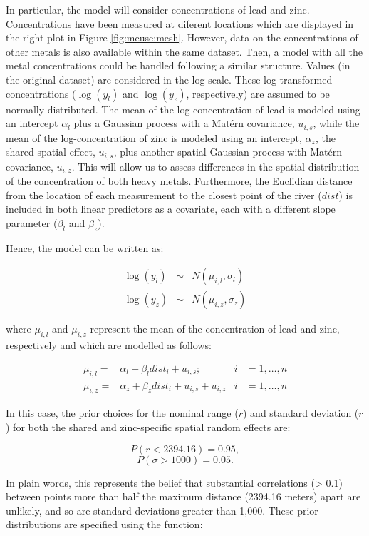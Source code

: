 In particular, the model will consider concentrations of lead and zinc. Concentrations have been measured at diferent locations which are displayed in the right plot in Figure \ref{fig:meuse:mesh}. However, data on the concentrations of other metals is also available within the same dataset. Then, a model with all the metal concentrations could be handled following a similar structure. Values (in the original dataset) are considered in the log-scale. These log-transformed concentrations ($\log(y_{l})$ and $\log(y_z)$, respectively) are assumed to be normally distributed. The mean of the log-concentration of lead is modeled using an intercept $\alpha_l$ plus a Gaussian process with a Matérn covariance, $u_{i,s}$, while the mean of the log-concentration of zinc is modeled using an intercept, $\alpha_z$, the shared spatial effect, $u_{i,s}$, plus another spatial Gaussian process with Matérn covariance, $u_{i,z}$. This will allow us to assess differences in the spatial distribution of the concentration of both heavy metals.  Furthermore, the Euclidian distance from the location of each measurement to the closest point of the river ($dist$) is included in both linear predictors as a covariate, each with a different slope parameter ($\beta_l$ and $\beta_z$). 

Hence, the model can be written as: 

$$
\begin{array}{rcl}
\log(y_{l}) &\sim& N(\mu_{i,l}, \sigma_l)\nonumber\\
\log(y_{z}) &\sim& N(\mu_{i,z}, \sigma_z)\nonumber
\end{array}
$$

\noindent
where $\mu_{i,l}$ and $\mu_{i,z}$ represent the mean of the concentration of lead and zinc, respectively and which are modelled as follows:


\begin{align}
\mu_{i,l} =& \alpha_l + \beta_l dist_i + u_{i,s};  &i&=1,\ldots,n\nonumber\\
\mu_{i,z} =& \alpha_z + \beta_z dist_i + u_{i,s} + u_{i,z}  &i&=1,\ldots,n\nonumber
\end{align}


\medskip
In this case, the prior choices for the nominal range ($r$) and standard deviation ($r$) for both the shared and zinc-specific spatial random effects are: 

$$ P(r < 2394.16) = 0.95,  $$
$$ P(\sigma > 1000) = 0.05 .$$

\noindent
In plain words, this represents the belief that substantial correlations (> 0.1) between points more than half the maximum distance (2394.16 meters) apart are unlikely, and so are standard deviations greater than 1,000. These prior distributions are specified using the  function:

